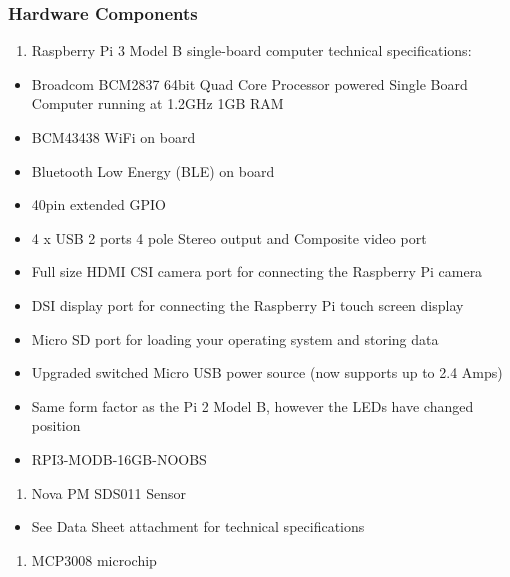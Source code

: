 \documentclass[
  authoryear,
  review,
  3p]{elsarticle}
\providecommand{\tightlist}{%
  \setlength{\itemsep}{0pt}\setlength{\parskip}{0pt}}\usepackage{longtable,booktabs,array}
\begin{document}
\hypertarget{hardware-components}{%
\subsubsection*{Hardware Components}\label{hardware-components}}

\begin{enumerate}
\def\labelenumi{\arabic{enumi}.}
\tightlist
\item
  Raspberry Pi 3 Model B single-board computer technical specifications:
\end{enumerate}

\begin{itemize}
\tightlist
\item
  Broadcom BCM2837 64bit Quad Core Processor powered Single Board
  Computer running at 1.2GHz 1GB RAM
\item
  BCM43438 WiFi on board
\item
  Bluetooth Low Energy (BLE) on board
\item
  40pin extended GPIO
\item
  4 x USB 2 ports 4 pole Stereo output and Composite video port
\item
  Full size HDMI CSI camera port for connecting the Raspberry Pi camera
\item
  DSI display port for connecting the Raspberry Pi touch screen display
\item
  Micro SD port for loading your operating system and storing data
\item
  Upgraded switched Micro USB power source (now supports up to 2.4 Amps)
\item
  Same form factor as the Pi 2 Model B, however the LEDs have changed
  position
\item
  RPI3-MODB-16GB-NOOBS
\end{itemize}

\begin{enumerate}
\def\labelenumi{\arabic{enumi}.}
\setcounter{enumi}{1}
\tightlist
\item
  Nova PM SDS011 Sensor
\end{enumerate}

\begin{itemize}
\tightlist
\item
  See Data Sheet attachment for technical specifications
\end{itemize}

\begin{enumerate}
\def\labelenumi{\arabic{enumi}.}
\setcounter{enumi}{2}
\tightlist
\item
  MCP3008 microchip
\end{enumerate}
\end{document}
